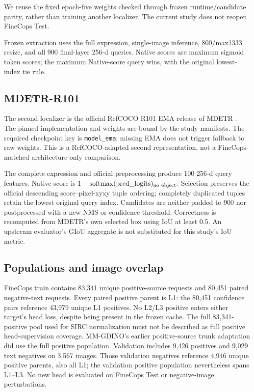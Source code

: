 \documentclass[10pt,twocolumn,letterpaper]{article}
\begin{document}
We reuse the fixed epoch-five weights checked through frozen
runtime/candidate parity, rather than training another localizer.
The current study does not reopen FineCops Test.

Frozen extraction uses the full expression, single-image inference,
800/max1333 resize, and all 900 final-layer 256-d queries. Native scores
are maximum sigmoid token scores; the maximum Native-score query wins,
with the original lowest-index tie rule.

\subsection{MDETR-R101}
The second localizer is the official RefCOCO R101 EMA release of
MDETR \cite{kamath2021mdetr}. The pinned implementation and weights are
bound by the study manifests. The required checkpoint key is
\texttt{model\_ema}; missing EMA does not trigger fallback to raw weights.
This is a RefCOCO-adapted second representation, not a
FineCops-matched architecture-only comparison.

The complete expression and official preprocessing produce 100
256-d query features. Native score is
$1-\operatorname{softmax}(\mathrm{pred\_logits})_{\rm no\ object}$.
Selection preserves the official descending score--pixel-xyxy tuple
ordering; completely duplicated tuples retain the lowest original query
index. Candidates are neither padded to 900 nor postprocessed with a new
NMS or confidence threshold.
Correctness is recomputed from MDETR's own selected box using IoU
at least 0.5. An upstream evaluator's GIoU aggregate is not substituted
for this study's IoU metric.

\subsection{Populations and image overlap}
FineCops train contains 83,341 unique positive-source requests and 80,451
paired negative-text requests. Every paired positive parent is L1:
the 80,451 confidence pairs reference 43,979 unique L1 positives.
No L2/L3 positive enters either target's head loss, despite being present
in the frozen cache. The full 83,341-positive pool used for SIRC
normalization must not be described as full positive head-supervision
coverage. MM-GDINO's earlier positive-source trunk adaptation did use
the full positive population.
Validation includes 9,426 positives and 9,029 text negatives on 3,567 images.
Those validation negatives reference 4,946 unique positive parents,
also all L1; the validation positive population nevertheless spans L1--L3.
No new head is evaluated on FineCops Test or negative-image perturbations.
\end{document}

